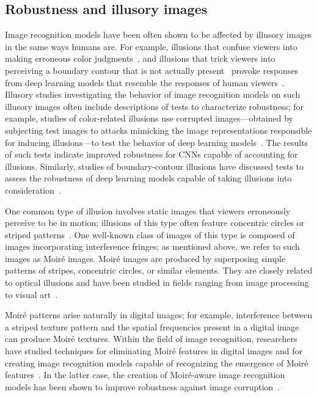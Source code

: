 \subsection{Robustness and illusory images}
\label{sec:Illusion_Moire_Robust}
Image recognition models have been often shown to be
affected by illusory images in the same ways humans are. For example,
illusions that confuse viewers into making erroneous color 
judgments~\cite{color2}, and illusions that trick viewers into 
perceiving a boundary contour that is not actually present~\cite{abu} 
provoke responses from deep learning models that resemble the responses 
of human viewers~\cite{color1,illusion}.
Illusory studies investigating the behavior of image recognition models
on such illusory images often include descriptions of tests
to characterize robustness; for example, studies of color-related 
illusions use corrupted images---obtained by subjecting test images 
to attacks mimicking the image representations responsible for
inducing illusions---to test the behavior of deep learning 
models~\cite{color1}. The results of such tests indicate improved
robustness for CNNs capable of accounting for illusions.
Similarly, studies of boundary-contour illusions have
discussed tests to assess the robustness of deep learning models
capable of taking illusions into consideration~\cite{abu}.



One common type of illusion involves static images
that viewers erroneously perceive to be in motion;
illusions of this type often feature concentric circles 
or striped patterns~\cite{abu,Fraser}. One
well-known class of images of this type is composed of images
incorporating interference fringes; as mentioned above, we refer to such images as Moir\'e images.
Moir\'e images are produced by superposing
simple patterns of stripes, concentric circles,
or similar elements. They are closely related to
optical illusions and have been studied in fields
ranging from image processing to visual art~\cite{moire_illusion}.



Moir\'e patterns arise naturally in digital images;
for example, interference between a striped texture pattern
and the spatial frequencies present in a digital image
can produce Moir\'e textures.
Within the field of image recognition, researchers have studied
techniques for eliminating Moir\'e features in digital images
and for creating image recognition models capable of recognizing
the emergence of Moir\'e features~\cite{Moire, MoireCNN}.
In the latter case, the creation of Moir\'e-aware image recognition
models has been shown to improve robustness against
image corruption~\cite{MoireCNN}.




